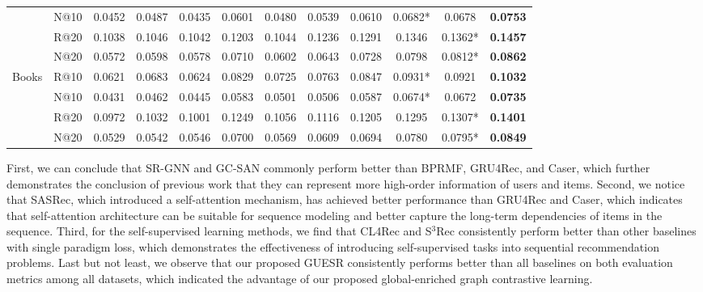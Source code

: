 \documentclass[runningheads]{llncs}
\begin{document}
\begin{table*}[t]
{\begin{tabular}{cccccccccccc}
                         & {{N@10}} & 0.0452 & 0.0487  & 0.0435 & 0.0601 & 0.0480   & 0.0539 & 0.0610 & 0.0682* & 0.0678  & \textbf{0.0753}  \\
                         & {{R@20}} & 0.1038 & 0.1046  & 0.1042 & 0.1203 & 0.1044   & 0.1236 & 0.1291 & 0.1346  &0.1362* & \textbf{0.1457}  \\
  & {{N@20}} & 0.0572 & 0.0598  & 0.0578 & 0.0710 & 0.0602   & 0.0643 & 0.0728 & 0.0798 & 0.0812* & \textbf{0.0862}  \\ \cline{1-12}
                    \multirow{4}{*}{Books}     & {{R@10}} & 0.0621 & 0.0683  & 0.0624 & 0.0829 & 0.0725   & 0.0763 & 0.0847 & 0.0931* & 0.0921& \textbf{0.1032}   \\
                         & {{N@10}} & 0.0431 & 0.0462  & 0.0445 & 0.0583 & 0.0501   & 0.0506 & 0.0587 & 0.0674* & 0.0672& \textbf{0.0735}  \\
                         & {{R@20}} & 0.0972 & 0.1032  & 0.1001 & 0.1249 & 0.1056   & 0.1116 & 0.1205 & 0.1295 & 0.1307* & \textbf{0.1401}   \\
  & {{N@20}} & 0.0529 & 0.0542  & 0.0546 & 0.0700 & 0.0569   & 0.0609 & 0.0694 & 0.0780    & 0.0795* & \textbf{0.0849}   \\ \cline{1-12}
			\hline
		\end{tabular}
	}\vspace{-10pt}
	\label{table:performance}
\end{table*}

First, we can conclude that SR-GNN and GC-SAN commonly perform better than BPRMF, GRU4Rec, and Caser, which further demonstrates the conclusion of previous work that they can represent more high-order information of users and items. 
Second, we notice that SASRec, which introduced a self-attention mechanism, has achieved better performance than GRU4Rec and Caser, which indicates that self-attention architecture can be suitable for sequence modeling and better capture the long-term dependencies of items in the sequence.
Third, for the self-supervised learning methods, we find that CL4Rec and S\(^3\)Rec consistently perform better than other baselines with single paradigm loss, which demonstrates the effectiveness of introducing self-supervised tasks into sequential recommendation problems. 
Last but not least, we observe that our proposed GUESR consistently performs better than all baselines on both evaluation metrics among all datasets, which indicated the advantage of our proposed global-enriched graph contrastive learning. 
\end{document}
